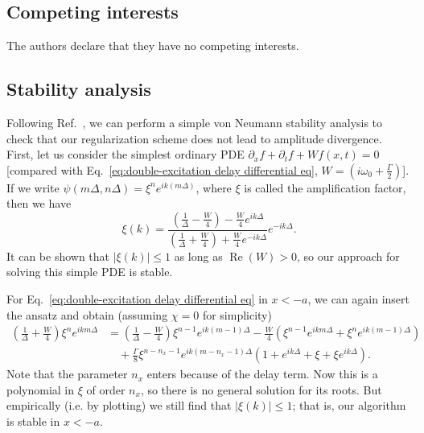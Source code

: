 \documentclass[12pt,letter,onecolumn,notitlepage]{article}
\DeclareMathOperator{\re}{Re}
\begin{document}
\subsection{Competing interests}
The authors declare that they have no competing interests.


\begin{appendices}
\section{Stability analysis}
\label{appen: stability}
Following Ref.~\cite{NumericalRecipes}, we can perform a simple von Neumann stability analysis to check that our regularization scheme does not lead to amplitude divergence. First, let us consider the simplest ordinary PDE $\partial_x f+\partial_t f+W f(x,t)=0$ [compared with Eq.~\eqref{eq:double-excitation delay differential eq}, $W=\left(i\omega_0+\frac{\Gamma}{2}\right)$]. If we write $\psi(m\Delta, n\Delta)=\xi^n e^{ik(m\Delta)}$, where $\xi$ is called the amplification factor, then we have 
\begin{equation}
	\xi(k) = \frac{\left(\frac{1}{\Delta}-\frac{W}{4}\right)-\frac{W}{4}e^{ik\Delta}}{\left(\frac{1}{\Delta}+\frac{W}{4}\right)+\frac{W}{4}e^{-ik\Delta}}e^{-ik\Delta}.
\end{equation}
It can be shown that $|\xi(k)|\leq 1$ as long as $\re(W)>0$, so our approach for solving this simple PDE is stable.

For Eq.~\eqref{eq:double-excitation delay differential eq} in $x<-a$, we can again insert the ansatz and obtain
(assuming $\chi=0$ for simplicity)
\begin{align}
	\left(\frac{1}{\Delta}+\frac{W}{4}\right)\xi^n e^{ikm\Delta}
	&=	\left(\frac{1}{\Delta}-\frac{W}{4}\right)\xi^{n-1} e^{ik(m-1)\Delta}
	-\frac{W}{4}\left(\xi^{n-1}e^{ikm\Delta}+\xi^{n}e^{ik(m-1)\Delta}\right)\nonumber\\
	&\quad+\frac{\Gamma}{8}\xi^{n-n_x-1}e^{ik(m-n_x-1)\Delta}\left(1+e^{ik\Delta}+\xi+\xi e^{ik\Delta}\right).
\end{align}
Note that the parameter $n_x$ enters because of the delay term. Now this is a polynomial in $\xi$ of order $n_x$, so there is no general solution for its roots. But empirically (i.e. by plotting) we still find that $|\xi(k)|\leq 1$; that is, our algorithm is stable in $x<-a$.


\end{appendices}
\end{document}
